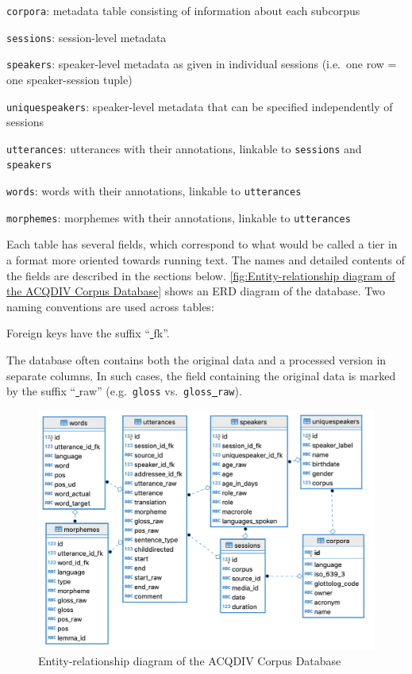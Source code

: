 \documentclass[a4paper, 11pt]{book}
\newcommand{\und}{\underline{{ }}\hspace{0.2mm}}	%
\begin{document}
\begin{itemize*}
	\item \texttt{corpora}: metadata table consisting of information about each subcorpus
	\item \texttt{sessions}: session-level metadata
	\item \texttt{speakers}: speaker-level metadata as given in individual sessions (i.e.\ one row = one speaker-session tuple)
	\item \texttt{uniquespeakers}: speaker-level metadata that can be specified independently of sessions
	\item \texttt{utterances}: utterances with their annotations, linkable to \texttt{sessions} and \texttt{speakers}
	\item \texttt{words}: words with their annotations, linkable to \texttt{utterances}
	\item \texttt{morphemes}: morphemes with their annotations, linkable to \texttt{utterances}
\end{itemize*}

Each table has several fields, which correspond to what would be called a tier in a format more oriented towards running text. The names and detailed contents of the fields are described in the sections below. \noindent \autoref{fig:Entity-relationship diagram of the ACQDIV Corpus Database} shows an ERD diagram of the database. Two naming conventions are used across tables: 

\begin{itemize*}
	\item Foreign keys have the suffix “\und fk”. 
	\item The database often contains both the original data and a processed version in separate columns. In such cases, the field containing the original data
		is marked by the suffix “\und raw” (e.g.\ \texttt{gloss} vs.\ \texttt{gloss\und raw}). 
\end{itemize*}


\begin{figure}
	\centering
	\includegraphics[scale=0.6]{pics/acqdiv-schema.png}
	\caption{Entity-relationship diagram of the ACQDIV Corpus Database}
	\label{fig:Entity-relationship diagram of the ACQDIV Corpus Database}
\end{figure}
\end{document}

